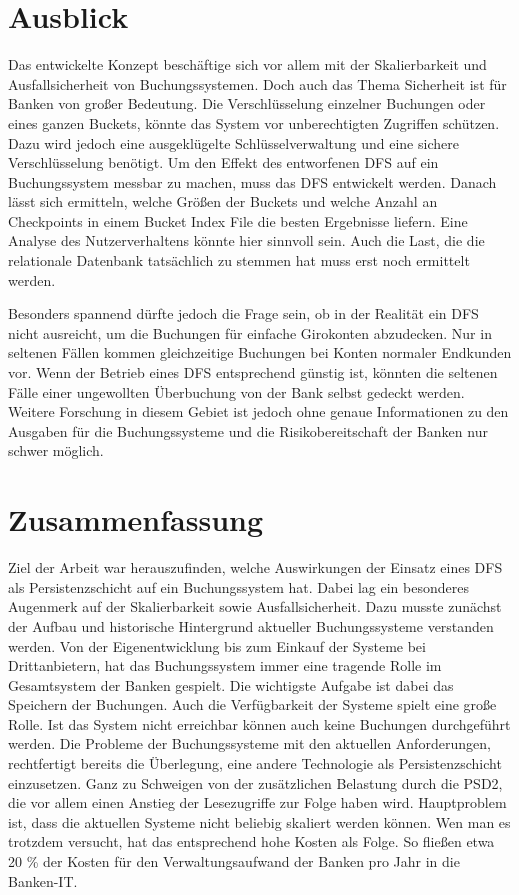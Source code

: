 \documentclass[12pt,oneside,a4paper,parskip]{scrbook}
\begin{document}
\chapter{Ausblick}
Das entwickelte Konzept beschäftige sich vor allem mit der Skalierbarkeit und Ausfallsicherheit von Buchungssystemen. Doch auch das Thema Sicherheit ist für Banken von großer Bedeutung. Die Verschlüsselung einzelner Buchungen oder eines ganzen Buckets, könnte das System vor unberechtigten Zugriffen schützen. Dazu wird jedoch eine ausgeklügelte Schlüsselverwaltung und eine sichere Verschlüsselung benötigt. Um den Effekt des entworfenen DFS auf ein Buchungssystem messbar zu machen, muss das DFS entwickelt werden. Danach lässt sich ermitteln, welche Größen der Buckets und welche Anzahl an Checkpoints in einem Bucket Index File die besten Ergebnisse liefern. Eine Analyse des Nutzerverhaltens könnte hier sinnvoll sein. Auch die Last, die die relationale Datenbank tatsächlich zu stemmen hat muss erst noch ermittelt werden. 

Besonders spannend dürfte jedoch die Frage sein, ob in der Realität ein DFS nicht ausreicht, um die Buchungen für einfache Girokonten abzudecken. Nur in seltenen Fällen kommen gleichzeitige Buchungen bei Konten normaler Endkunden vor. Wenn der Betrieb eines DFS entsprechend günstig ist, könnten die seltenen Fälle einer ungewollten Überbuchung von der Bank selbst gedeckt werden. Weitere Forschung in diesem Gebiet ist jedoch ohne genaue Informationen zu den Ausgaben für die Buchungssysteme und die Risikobereitschaft der Banken nur schwer möglich.

\chapter{Zusammenfassung}
Ziel der Arbeit war herauszufinden, welche Auswirkungen der Einsatz eines DFS als Persistenzschicht auf ein Buchungssystem hat. Dabei lag ein besonderes Augenmerk auf der Skalierbarkeit sowie Ausfallsicherheit. Dazu musste zunächst der Aufbau und historische Hintergrund aktueller Buchungssysteme verstanden werden. Von der Eigenentwicklung bis zum Einkauf der Systeme bei Drittanbietern, hat das Buchungssystem immer eine tragende Rolle im Gesamtsystem der Banken gespielt. Die wichtigste Aufgabe ist dabei das Speichern der Buchungen. Auch die Verfügbarkeit der Systeme spielt eine große Rolle. Ist das System nicht erreichbar können auch keine Buchungen durchgeführt werden. Die Probleme der Buchungssysteme mit den aktuellen Anforderungen, rechtfertigt bereits die Überlegung, eine andere Technologie als Persistenzschicht einzusetzen. Ganz zu Schweigen von der zusätzlichen Belastung durch die PSD2, die vor allem einen Anstieg der Lesezugriffe zur Folge haben wird. Hauptproblem ist, dass die aktuellen Systeme nicht beliebig skaliert werden können. Wen man es trotzdem versucht, hat das entsprechend hohe Kosten als Folge. So fließen etwa 20 \% der Kosten für den Verwaltungsaufwand der Banken pro Jahr in die Banken-IT. 
\end{document}
